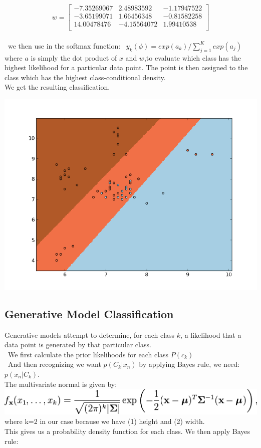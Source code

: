 \documentclass[11pt, oneside]{article}   	%
\begin{document}
\[
w=
  \begin{bmatrix}
    -7.35269067 & 2.48983592 & -1.17947522\\
    -3.65199071 & 1.66456348 & -0.81582258\\
    14.00478476 & -4.15564072 & 1.99410538\\	
	
  \end{bmatrix}
\]
\\
\
 we then use in the softmax function:
\
$y_k(\phi) = exp(a_k)/\sum\limits_{j=1}^K exp(a_j)$
\\
where $a$ is simply the dot product of $x$ and $w$,to evaluate which class has the highest likelihood for a particular data point. The point is then assigned to the class which has the highest class-conditional density.
\\
We get the resulting classification.
\begin{center}
  \includegraphics[scale=.55]{logistic_classifer}
\end{center}


\subsection*{Generative Model Classification}

Generative models attempt to determine, for each class $k$, a likelihood that a data point is generated by that particular class.
\\
\ We first calculate the prior likelihoods for each class $P(c_k)$
\\
\ And then recognizing we want $p(C_k |x_n)$ by applying Bayes rule, we need: $p(x_n |C_k)$.
\\
The multivariate normal is given by:
\
\\
 \includegraphics[scale=.5]{formula}
\\
where k=2 in our case because we have (1) height and (2) width.
\
\\
This gives us a probability density function for each class. We then apply Bayes rule:
\end{document}
